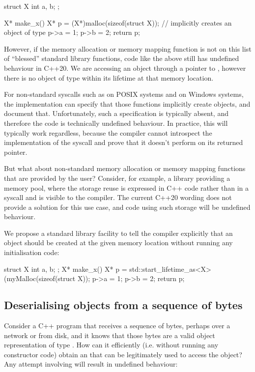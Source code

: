 \begin{codeblock}
struct X {
  int a, b;
};

X* make_x() {
  X* p = (X*)malloc(sizeof(struct X)); // implicitly creates an object of type 
  p->a = 1;
  p->b = 2;
  return p;
}
\end{codeblock}

However, if the memory allocation or memory mapping function is not on this list of ``blessed'' standard library functions, code like the above still has undefined behaviour in C++20. We are accessing an object through a pointer to , however there is no object of type  within its lifetime at that memory location.

For non-standard syscalls such as  on POSIX systems and  on Windows systems, the implementation can specify that those functions implicitly create objects, and document that. Unfortunately, such a specification is typically absent, and therefore the code is technically undefined behaviour. In practice, this will typically work regardless, because the compiler cannot introspect the implementation of the syscall and prove that it doesn't perform  on its returned pointer.

But what about non-standard memory allocation or memory mapping functions that are provided by the user? Consider, for example, a library providing a memory pool, where the storage reuse is expressed in C++ code rather than in a syscall and is visible to the compiler. The current C++20 wording does not provide a solution for this use case, and code using such storage will be undefined behaviour.

We propose a standard library facility \mbox{} to tell the compiler explicitly that an object should be created at the given memory location without running any initialisation code:

\begin{codeblock}
struct X { int a, b; };
X* make_x() {
  X* p = std::start_lifetime_as<X>(myMalloc(sizeof(struct X));
  p->a = 1;
  p->b = 2;
  return p;
}
\end{codeblock}

\subsection{Deserialising objects from a sequence of bytes}

Consider a C++ program that receives a sequence of bytes, perhaps over a network or from disk, and it knows that those bytes are a valid object representation of type . How can it efficiently (i.e. without running any constructor code) obtain an  that can be legitimately used to access the object? Any attempt involving  will result in undefined behaviour:

